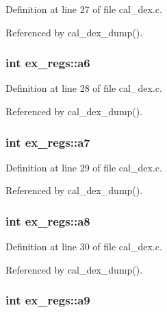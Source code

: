 Definition at line 27 of file cal\+\_\+dex.\+c.



Referenced by cal\+\_\+dex\+\_\+dump().

\subsubsection[{\texorpdfstring{a6}{a6}}]{\setlength{\rightskip}{0pt plus 5cm}int ex\+\_\+regs\+::a6}\hypertarget{structex__regs_a23fa5fa94f11950e7320393beb830618}{}\label{structex__regs_a23fa5fa94f11950e7320393beb830618}


Definition at line 28 of file cal\+\_\+dex.\+c.



Referenced by cal\+\_\+dex\+\_\+dump().

\subsubsection[{\texorpdfstring{a7}{a7}}]{\setlength{\rightskip}{0pt plus 5cm}int ex\+\_\+regs\+::a7}\hypertarget{structex__regs_a73f04b635c3699e9b83fadeacdb1eda2}{}\label{structex__regs_a73f04b635c3699e9b83fadeacdb1eda2}


Definition at line 29 of file cal\+\_\+dex.\+c.



Referenced by cal\+\_\+dex\+\_\+dump().

\subsubsection[{\texorpdfstring{a8}{a8}}]{\setlength{\rightskip}{0pt plus 5cm}int ex\+\_\+regs\+::a8}\hypertarget{structex__regs_a4a700b056da9b3ea0917603b9c4f9b28}{}\label{structex__regs_a4a700b056da9b3ea0917603b9c4f9b28}


Definition at line 30 of file cal\+\_\+dex.\+c.



Referenced by cal\+\_\+dex\+\_\+dump().

\subsubsection[{\texorpdfstring{a9}{a9}}]{\setlength{\rightskip}{0pt plus 5cm}int ex\+\_\+regs\+::a9}\hypertarget{structex__regs_a513f72e66ad69090bdbb06fb37f177d1}{}\label{structex__regs_a513f72e66ad69090bdbb06fb37f177d1}


